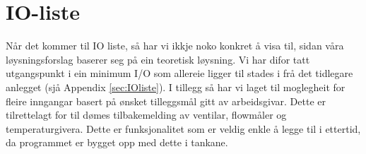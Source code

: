 \section{IO-liste}
\thispagestyle{fancy}

Når det kommer til \gls{IO} liste, så har vi ikkje noko konkret å visa til, sidan våra løysningsforslag baserer seg på ein teoretisk løysning. 
Vi har difor tatt utgangspunkt i ein minimum I/O som allereie ligger til stades i frå det tidlegare anlegget (sjå Appendix \ref{sec:IOliste}). 
I tillegg så har vi laget til moglegheit for fleire inngangar basert på ønsket tilleggsmål gitt av arbeidsgivar. 
Dette er tilrettelagt for til dømes tilbakemelding av ventilar, flowmåler og temperaturgivera.
Dette er funksjonalitet som er veldig enkle å legge til i ettertid, da programmet er bygget opp med dette i tankane.

\newpage